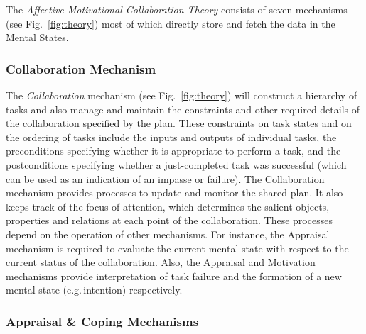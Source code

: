 The \textit{Affective Motivational Collaboration Theory} consists of seven
mechanisms (see Fig.~\ref{fig:theory}) most of which directly store and
fetch the data in the Mental States.

\subsubsection{Collaboration Mechanism}
\label{sec:collaboration-mech}

The \textit{Collaboration} mechanism (see Fig.~\ref{fig:theory}) will construct
a hierarchy of tasks and also manage and maintain the constraints and other
required details of the collaboration specified by the plan. These constraints
on task states and on the ordering of tasks include the inputs and outputs of
individual tasks, the preconditions specifying whether it is appropriate to
perform a task, and the postconditions specifying whether a just-completed task
was successful (which can be used as an indication of an impasse or failure).
The Collaboration mechanism provides processes to update and monitor the shared
plan. It also keeps track of the focus of attention, which determines the
salient objects, properties and relations at each point of the collaboration.
These processes depend on the operation of other mechanisms. For instance,
the Appraisal mechanism is required to evaluate the current mental state with
respect to the current status of the collaboration. Also, the Appraisal and
Motivation mechanisms provide interpretation of task failure and the formation
of a new mental state (e.g.\,intention) respectively.

\subsubsection{Appraisal \& Coping Mechanisms}
\label{sec:appraisal-coping-mech}

